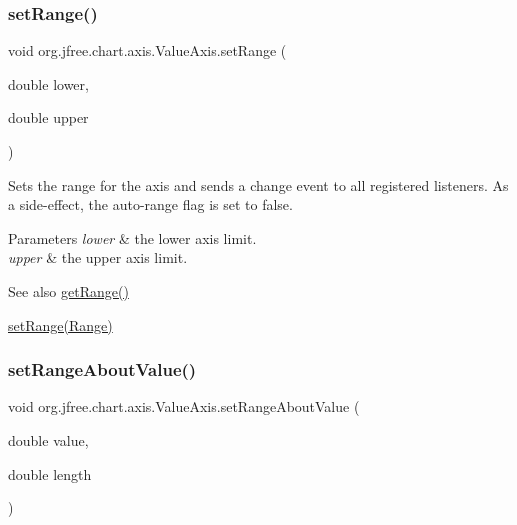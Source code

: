 \subsubsection{\texorpdfstring{set\+Range()}{setRange()}\hspace{0.1cm}{\footnotesize\ttfamily [3/3]}}
{\footnotesize\ttfamily void org.\+jfree.\+chart.\+axis.\+Value\+Axis.\+set\+Range (\begin{DoxyParamCaption}\item[{double}]{lower,  }\item[{double}]{upper }\end{DoxyParamCaption})}

Sets the range for the axis and sends a change event to all registered listeners. As a side-\/effect, the auto-\/range flag is set to {\ttfamily false}.


\begin{DoxyParams}{Parameters}
{\em lower} & the lower axis limit. \\
\hline
{\em upper} & the upper axis limit.\\
\hline
\end{DoxyParams}
\begin{DoxySeeAlso}{See also}
\mbox{\hyperlink{classorg_1_1jfree_1_1chart_1_1axis_1_1_value_axis_af52527fb8e81b79bdf0042eda7c7f138}{get\+Range()}} 

\mbox{\hyperlink{classorg_1_1jfree_1_1chart_1_1axis_1_1_value_axis_a917f68b11632931a40e57551164c181e}{set\+Range(\+Range)}} 
\end{DoxySeeAlso}
\mbox{\label{classorg_1_1jfree_1_1chart_1_1axis_1_1_value_axis_a4647712d5c422013e1408559ee43d38f}} 
\subsubsection{\texorpdfstring{set\+Range\+About\+Value()}{setRangeAboutValue()}}
{\footnotesize\ttfamily void org.\+jfree.\+chart.\+axis.\+Value\+Axis.\+set\+Range\+About\+Value (\begin{DoxyParamCaption}\item[{double}]{value,  }\item[{double}]{length }\end{DoxyParamCaption})}

